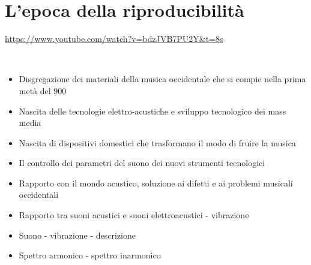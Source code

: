 
\section{L'epoca della riproducibilità}

\url{https://www.youtube.com/watch?v=bdzJVB7PU2Y&t=8s}

~\vfill

\Large

\begin{itemize}
\item Disgregazione dei materiali della musica occidentale che si compie nella prima metà del 900
\item Nascita delle tecnologie elettro-acustiche e sviluppo tecnologico dei mass media
\item Nascita di dispositivi domestici che  trasformano il modo di fruire la musica
\item Il controllo dei parametri del suono dei nuovi strumenti tecnologici
\item Rapporto con il mondo acustico, soluzione ai difetti e ai problemi musicali occidentali
\item Rapporto tra suoni acustici e suoni elettroacustici - vibrazione
\item Suono - vibrazione - descrizione
\item Spettro armonico - spettro inarmonico
\end{itemize}

\clearpage













